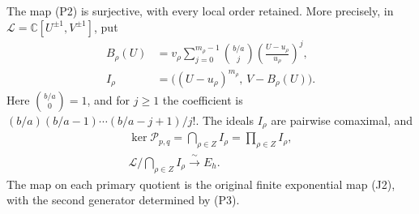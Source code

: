 \begin{theorem}
\label{thm:two-prime-laurent-presentation}
The map (P2) is surjective, with every local order retained. More
precisely, in \(\mathscr L=\mathbb C[U^{\pm1},V^{\pm1}]\), put
\[
 \begin{aligned}
 B_\rho(U)&=v_\rho\sum_{j=0}^{m_\rho-1}
     \binom{b/a}{j}\left(\frac{U-u_\rho}{u_\rho}\right)^j,
 \\
 I_\rho&=\big((U-u_\rho)^{m_\rho},\,V-B_\rho(U)\big).
 \end{aligned}
 \tag{P3}
\]
Here \(\binom{b/a}{0}=1\), and for \(j\geq1\) the coefficient is
\((b/a)(b/a-1)\cdots(b/a-j+1)/j!\).
The ideals \(I_\rho\) are pairwise comaximal, and
\[
 \begin{gathered}
 \ker\mathscr P_{p,q}
       =\bigcap_{\rho\in Z}I_\rho
       =\prod_{\rho\in Z}I_\rho,\\
 \mathscr L\Big/\bigcap_{\rho\in Z}I_\rho
       \xrightarrow{\ \sim\ }E_h.
 \end{gathered}
 \tag{P4}
\]
The map on each primary quotient is the original finite exponential
map (J2), with the second generator determined by (P3).
\end{theorem}
